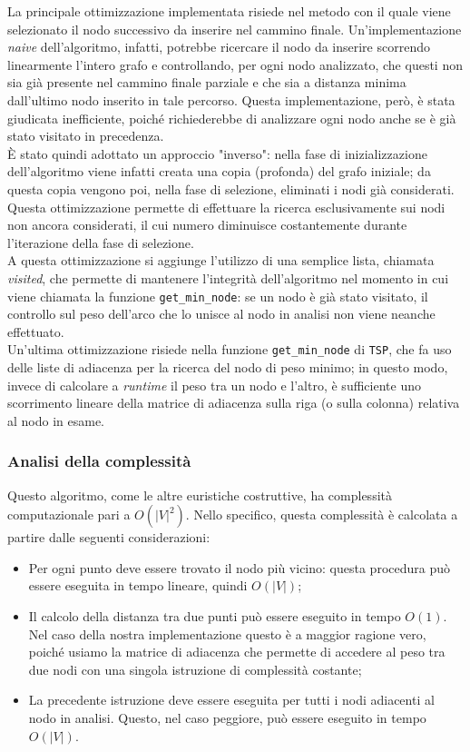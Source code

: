 La principale ottimizzazione implementata risiede nel metodo con il quale viene selezionato il nodo successivo da inserire nel cammino finale. Un'implementazione \textit{naive} dell'algoritmo, infatti, potrebbe ricercare il nodo da inserire scorrendo linearmente l'intero grafo e controllando, per ogni nodo analizzato, che questi non sia già presente nel cammino finale parziale e che sia a distanza minima dall'ultimo nodo inserito in tale percorso. Questa implementazione, però, è stata giudicata inefficiente, poiché richiederebbe di analizzare ogni nodo anche se è già stato visitato in precedenza. \\
È stato quindi adottato un approccio "inverso": nella fase di inizializzazione dell'algoritmo viene infatti creata una copia (profonda) del grafo iniziale; da questa copia vengono poi, nella fase di selezione, eliminati i nodi già considerati. Questa ottimizzazione permette di effettuare la ricerca esclusivamente sui nodi non ancora considerati, il cui numero diminuisce costantemente durante l'iterazione della fase di selezione. \\
A questa ottimizzazione si aggiunge l'utilizzo di una semplice lista, chiamata \textit{visited}, che permette di mantenere l'integrità dell'algoritmo nel momento in cui viene chiamata la funzione \texttt{get\_min\_node}: se un nodo è già stato visitato, il controllo sul peso dell'arco che lo unisce al nodo in analisi non viene neanche effettuato. \\
Un'ultima ottimizzazione risiede nella funzione \texttt{get\_min\_node} di \texttt{TSP}, che fa uso delle liste di adiacenza per la ricerca del nodo di peso minimo; in questo modo, invece di calcolare a \textit{runtime} il peso tra un nodo e l'altro, è sufficiente uno scorrimento lineare della matrice di adiacenza sulla riga (o sulla colonna) relativa al nodo in esame.

\subsubsection{Analisi della complessità}

Questo algoritmo, come le altre euristiche costruttive, ha complessità computazionale pari a $O(|V|^2)$. Nello specifico, questa complessità è calcolata a partire dalle seguenti considerazioni:
\begin{itemize}
    \item Per ogni punto deve essere trovato il nodo più vicino: questa procedura può essere eseguita in tempo lineare, quindi $O(|V|)$;
    \item Il calcolo della distanza tra due punti può essere eseguito in tempo $O(1)$. Nel caso della nostra implementazione questo è a maggior ragione vero, poiché usiamo la matrice di adiacenza che permette di accedere al peso tra due nodi con una singola istruzione di complessità costante;
    \item La precedente istruzione deve essere eseguita per tutti i nodi adiacenti al nodo in analisi. Questo, nel caso peggiore, può essere eseguito in tempo $O(|V|)$.
\end{itemize}

